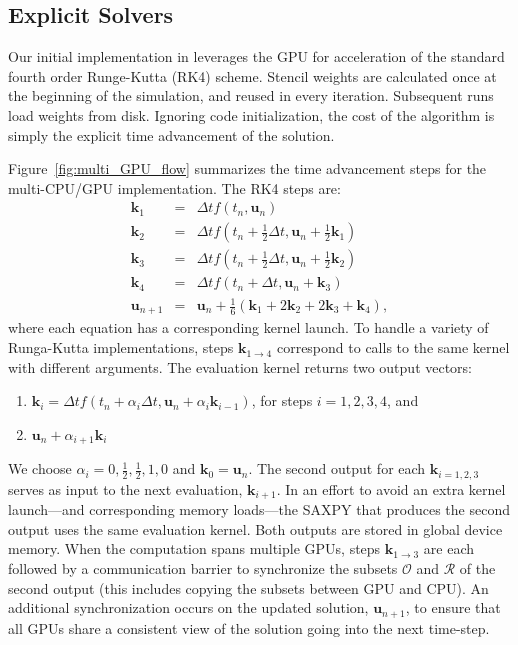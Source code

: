 \documentclass{report}
\begin{document}
\subsection{Explicit Solvers}


Our initial implementation in \cite{BolligFlyerErlebacher2012} leverages the GPU for acceleration of the standard fourth order Runge-Kutta (RK4) scheme. Stencil weights are calculated once at the beginning of the simulation, and reused in every iteration. Subsequent runs load weights from disk. Ignoring code initialization, the cost of the algorithm is simply the explicit time advancement of the solution. 

Figure~\ref{fig:multi_GPU_flow} summarizes the time advancement steps for the multi-CPU/GPU implementation. The RK4 steps are: 
\begin{eqnarray*} 
\mathbf{k}_1 &=& \Delta t f(t_n, \mathbf{u}_n) \\
\mathbf{k}_2 &=& \Delta t f(t_n+\frac{1}{2}\Delta t, \mathbf{u}_n + \frac{1}{2}\mathbf{k}_1) \\
\mathbf{k}_3 &=& \Delta t f(t_n+\frac{1}{2}\Delta t, \mathbf{u}_n + \frac{1}{2}\mathbf{k}_2) \\
\mathbf{k}_4 &=& \Delta t f(t_n+\Delta t, \mathbf{u}_n + \mathbf{k}_3) \\
\mathbf{u}_{n+1} &=& \mathbf{u}_{n} + \frac{1}{6}(\mathbf{k}_1 + 2\mathbf{k}_2 + 2\mathbf{k}_3 +\mathbf{k}_4),
\label{eqn:rk4}
\end{eqnarray*}
where each equation has a corresponding kernel launch. To handle a variety of Runga-Kutta implementations, steps $\mathbf{k}_{1\rightarrow4}$ correspond to calls to the same kernel with different arguments. The evaluation kernel returns two output vectors: 
\begin{enumerate} 
\item $\mathbf{k}_i = \Delta t f(t_n + \alpha_{i} \Delta t, \mathbf{u}_n + \alpha_{i} \mathbf{k}_{i-1})$, for steps $i=1,2,3,4$, and
\item  $\mathbf{u}_n + \alpha_{i+1} \mathbf{k}_i$
\end{enumerate} 
We choose $\alpha_{i}=0, \frac{1}{2}, \frac{1}{2}, 1, 0$ and $\mathbf{k}_{0} = \mathbf{u}_n$. The second output for each $\mathbf{k}_{i=1,2,3}$ serves as input to the next evaluation, $\mathbf{k}_{i+1}$. In an effort to avoid an extra kernel launch---and corresponding memory loads---the SAXPY that produces the second output uses the same evaluation kernel. Both outputs are stored in global device memory. When the computation spans multiple GPUs, steps $\mathbf{k}_{1\rightarrow3}$ are each followed by a communication barrier to synchronize the subsets $\mathcal{O}$ and $\mathcal{R}$ of the second output (this includes copying the subsets between GPU and CPU). An additional synchronization occurs on the updated  solution, $\mathbf{u}_{n+1}$, to ensure that all GPUs share a consistent view of the solution going into the next time-step.
\end{document}

